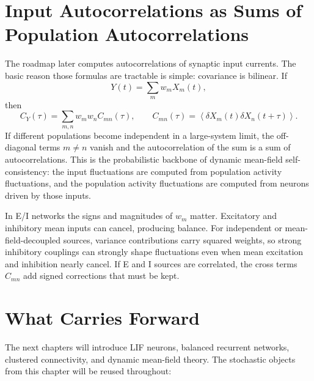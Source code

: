 \section{Input Autocorrelations as Sums of Population Autocorrelations}
\label{sec:input-autocorrelation-sums}

The roadmap later computes autocorrelations of synaptic input currents. The basic reason those formulas are tractable is simple: covariance is bilinear. If
%
\begin{equation}
  Y(t) = \sum_m w_m X_m(t),
  \label{eq:weighted-sum-process}
\end{equation}
%
then
%
\begin{equation}
  C_Y(\tau)
  =
  \sum_{m,n} w_m w_n C_{mn}(\tau),
  \qquad
  C_{mn}(\tau)
  =
  \left\langle
  \delta X_m(t)\delta X_n(t+\tau)
  \right\rangle.
  \label{eq:covariance-weighted-sum}
\end{equation}
%
If different populations become independent in a large-system limit, the off-diagonal terms $m\ne n$ vanish and the autocorrelation of the sum is a sum of autocorrelations. This is the probabilistic backbone of dynamic mean-field self-consistency: the input fluctuations are computed from population activity fluctuations, and the population activity fluctuations are computed from neurons driven by those inputs.

In E/I networks the signs and magnitudes of $w_m$ matter. Excitatory and inhibitory mean inputs can cancel, producing balance. For independent or mean-field-decoupled sources, variance contributions carry squared weights, so strong inhibitory couplings can strongly shape fluctuations even when mean excitation and inhibition nearly cancel. If E and I sources are correlated, the cross terms $C_{mn}$ add signed corrections that must be kept.

\section{What Carries Forward}
\label{sec:stochastic-carry-forward}

The next chapters will introduce LIF neurons, balanced recurrent networks, clustered connectivity, and dynamic mean-field theory. The stochastic objects from this chapter will be reused throughout:


